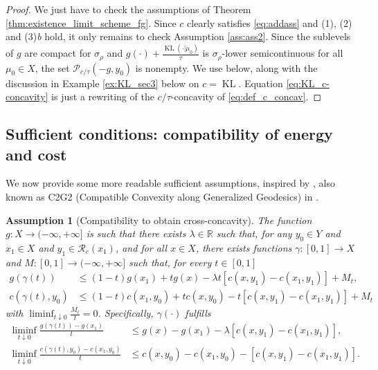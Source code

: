 \documentclass[reqno]{amsart}
\newcounter{results}[section]
\theoremstyle{plain}
\theoremstyle{remark}
\theoremstyle{plain}
\newtheorem{assumption}[results]{Assumption}
\numberwithin{equation}{section}
\theoremstyle{remark}
\newcommand{\R}{\mathbb{R}}
\newcommand{\calP}{\mathcal{P}}
\newcommand{\calR}{\mathcal{R}}
\DeclareMathOperator{\KL}{KL}
\begin{document}
\begin{proof}
We just have to check the assumptions of Theorem \ref{thm:existence_limit_scheme_fg}. Since $c$ clearly  satisfies  \eqref{eq:addass} and (1), (2) and (3){\it b}  hold,  it only remains to check Assumption \ref{ass:ass2}.
Since  the sublevels  of $g$ are compact for  $\sigma_\rho$  and $g(\cdot)+\frac{\KL(\cdot| \mu_0)}{\tau}$ is $\sigma_\rho$-lower semicontinuous for all $\mu_0 \in X$, the set $\calP_{c/\tau}(-g,y_0)$ is  nonempty.  We use  below, along with the discussion  in Example \ref{ex:KL_sec3} below  on $c=\KL$. Equation \eqref{eq:KL_c-concavity} is just a rewriting of the $c/\tau$-concavity of \eqref{eq:def_c_concav}.
\end{proof}

 



\subsection{Sufficient conditions: compatibility of energy and cost}\label{sec:compatibility}




We now provide some more readable sufficient assumptions, inspired by \cite[Section 3.2.4]{Ambrosio2012userguide}, also known as C2G2 (Compatible Convexity along Generalized Geodesics) in \cite{Santambrogio2017}.


\begin{assumption}[Compatibility to obtain cross-concavity]\label{ass:ced_cross-concave}
The function $g:X \to (-\infty, + \infty]$ is such that there exists $\lambda\in\R$ such that, for any $y_0\in Y$ and $x_1\in X$ and $y_1\in \calR_c(x_1)$, and for all $x\in X$, there exists functions $\gamma:[0,1]\to X$ and $M:[0,1]\to (-\infty, +\infty]$ such that, for every $t\in[0,1]$
    \begin{align}
        g(\gamma(t)) &\le (1-t)g(x_1)+tg(x)-\lambda t [c(x,y_1)- c(x_1,y_1)]+M_t, \label{eq:ced_g} \\
        c(\gamma(t),y_0) &\le (1-t)c(x_1,y_0)+tc(x,y_0)- t [c(x,y_1)-c(x_1,y_1)]+M_t \label{eq:ced_g_c} 
    \end{align}
    with $\liminf_{t\downarrow 0}\frac{M_t}{t}=0$.  Specifically,  $\gamma(\cdot)$  fulfills 
    \begin{align}
        \liminf_{t\downarrow 0}\frac{g(\gamma(t))-g(x_1)}{t} &\le g(x)-g(x_1)-\lambda [c(x,y_1)- c(x_1,y_1)], \label{eq:ced_g2} \\
        \liminf_{t\downarrow 0}\frac{c(\gamma(t),y_0)-c(x_1,y_0)}{t} &\le c(x,y_0)-c(x_1,y_0)- [c(x,y_1)-c(x_1,y_1)]. \label{eq:ced_g_c2} 
    \end{align}
\end{assumption}
\end{document}
